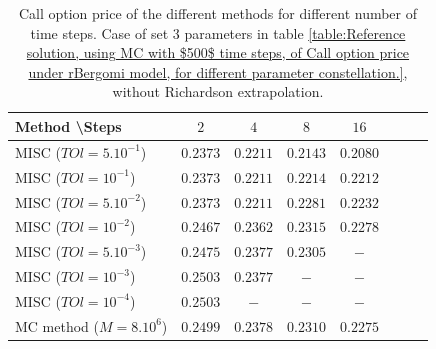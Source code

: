 \documentclass[11pt]{article}
\begin{document}
\begin{table}[h!]
\centering
\begin{tabular}{l*{6}{c}r}
Method \textbackslash  Steps            & $2$ & $4$ & $8$ & $16$ &   \\
\hline
MISC ($TOl=5.10^{-1}$)  & $0.2373$ & $0.2211$ & $0.2143$ & $0.2080$  \\
MISC ($TOl=10^{-1}$)  & $0.2373$  & $0.2211$ & $0.2214$ & $0.2212$  \\
MISC ($TOl=5.10^{-2}$)  & $0.2373$  &$0.2211$ & $0.2281$ & $0.2232$  \\
MISC ($TOl=10^{-2}$)  & $0.2467$ & $0.2362$ & $0.2315$ &$0.2278$  \\
MISC ($TOl=5.10^{-3}$)  & $0.2475$ & $0.2377$ & $0.2305$ & $-$  \\
MISC ($TOl=10^{-3}$)  & $0.2503$ & $0.2377$ & $-$ & $-$  \\
MISC ($TOl=10^{-4}$)  & $0.2503$ & $-$ & $-$ & $-$  \\
\hline
MC method ($M=8.10^{6}$)   & $ 0.2499$ & $  0.2378$  & $ 0.2310
$ & $   0.2275$ \\		

\hline
\end{tabular}
\caption{ Call option price of the different methods for different number of time steps. Case of set $3$ parameters in table \ref{table:Reference solution, using MC with $500$ time steps, of Call option price under rBergomi model, for different parameter constellation.}, without Richardson extrapolation.}
\label{table: Call option price of the different methods for different number of time steps. Case set 3,linear}
\end{table}
\end{document}
